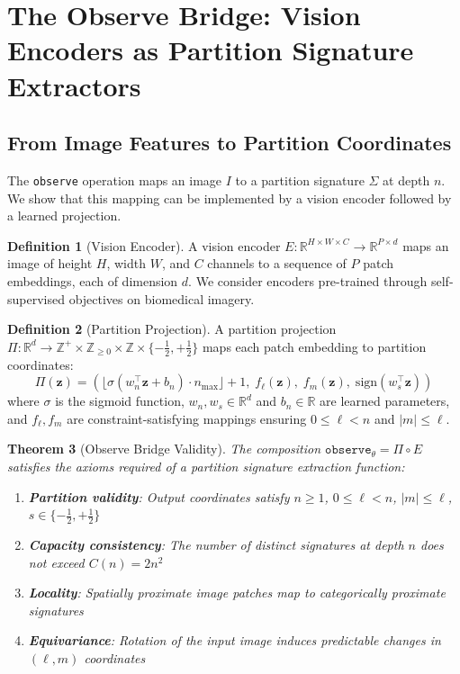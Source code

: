 \documentclass[11pt,a4paper]{article}
\newtheorem{theorem}{Theorem}[section]
\theoremstyle{definition}
\newtheorem{definition}[theorem]{Definition}
\theoremstyle{remark}
\newcommand{\Sig}{\Sigma}
\newcommand{\R}{\mathbb{R}}
\newcommand{\Z}{\mathbb{Z}}
\begin{document}
\section{The Observe Bridge: Vision Encoders as Partition Signature Extractors}
\label{sec:observe}

\subsection{From Image Features to Partition Coordinates}

The \texttt{observe} operation maps an image $I$ to a partition signature $\Sig$ at depth $n$. We show that this mapping can be implemented by a vision encoder followed by a learned projection.

\begin{definition}[Vision Encoder]
\label{def:encoder}
A vision encoder $E: \R^{H \times W \times C} \to \R^{P \times d}$ maps an image of height $H$, width $W$, and $C$ channels to a sequence of $P$ patch embeddings, each of dimension $d$. We consider encoders pre-trained through self-supervised objectives on biomedical imagery.
\end{definition}

\begin{definition}[Partition Projection]
\label{def:projection}
A partition projection $\Pi: \R^d \to \Z^+ \times \Z_{\geq 0} \times \Z \times \{-\frac{1}{2}, +\frac{1}{2}\}$ maps each patch embedding to partition coordinates:
\begin{equation}
\Pi(\mathbf{z}) = \left(\lfloor \sigma(w_n^\top \mathbf{z} + b_n) \cdot n_{\max} \rfloor + 1, \; f_\ell(\mathbf{z}), \; f_m(\mathbf{z}), \; \text{sign}(w_s^\top \mathbf{z})\right)
\end{equation}
where $\sigma$ is the sigmoid function, $w_n, w_s \in \R^d$ and $b_n \in \R$ are learned parameters, and $f_\ell, f_m$ are constraint-satisfying mappings ensuring $0 \leq \ell < n$ and $|m| \leq \ell$.
\end{definition}

\begin{theorem}[Observe Bridge Validity]
\label{thm:observe}
The composition $\texttt{observe}_\theta = \Pi \circ E$ satisfies the axioms required of a partition signature extraction function:
\begin{enumerate}
    \item \textbf{Partition validity}: Output coordinates satisfy $n \geq 1$, $0 \leq \ell < n$, $|m| \leq \ell$, $s \in \{-\frac{1}{2}, +\frac{1}{2}\}$
    \item \textbf{Capacity consistency}: The number of distinct signatures at depth $n$ does not exceed $C(n) = 2n^2$
    \item \textbf{Locality}: Spatially proximate image patches map to categorically proximate signatures
    \item \textbf{Equivariance}: Rotation of the input image induces predictable changes in $(\ell, m)$ coordinates
\end{enumerate}
\end{theorem}
\end{document}
